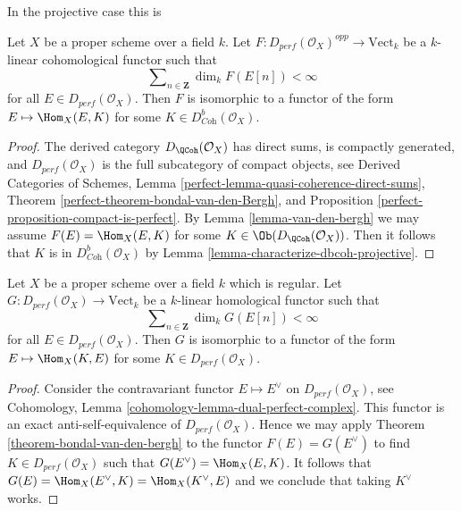 \begin{theorem}
\label{theorem-bondal-van-den-bergh}
\begin{reference}
In the projective case this is \cite[Theorem A.1]{BvdB}
\end{reference}
Let $X$ be a proper scheme over a field $k$.
Let $F : D_{perf}(\mathcal{O}_X)^{opp} \to \text{Vect}_k$
be a $k$-linear cohomological functor such that
$$
\sum\nolimits_{n \in \mathbf{Z}} \dim_k F(E[n]) < \infty
$$
for all $E \in D_{perf}(\mathcal{O}_X)$. Then $F$ is isomorphic to a functor
of the form $E \mapsto \Hom_X(E, K)$ for some
$K \in D^b_{\textit{Coh}}(\mathcal{O}_X)$.
\end{theorem}

\begin{proof}
The derived category $D_\QCoh(\mathcal{O}_X)$ has direct sums,
is compactly generated, and $D_{perf}(\mathcal{O}_X)$ is the full subcategory
of compact objects, see
Derived Categories of Schemes, Lemma
\ref{perfect-lemma-quasi-coherence-direct-sums},
Theorem \ref{perfect-theorem-bondal-van-den-Bergh}, and
Proposition \ref{perfect-proposition-compact-is-perfect}.
By Lemma \ref{lemma-van-den-bergh} we may assume
$F(E) = \Hom_X(E, K)$ for some $K \in \Ob(D_\QCoh(\mathcal{O}_X))$.
Then it follows that $K$ is in $D^b_{\textit{Coh}}(\mathcal{O}_X)$
by Lemma \ref{lemma-characterize-dbcoh-projective}.
\end{proof}

\begin{lemma}
\label{lemma-homological-representable}
Let $X$ be a proper scheme over a field $k$ which is regular.
Let $G : D_{perf}(\mathcal{O}_X) \to \text{Vect}_k$
be a $k$-linear homological functor such that
$$
\sum\nolimits_{n \in \mathbf{Z}} \dim_k G(E[n]) < \infty
$$
for all $E \in D_{perf}(\mathcal{O}_X)$. Then $G$ is isomorphic to a functor
of the form $E \mapsto \Hom_X(K, E)$ for some $K \in D_{perf}(\mathcal{O}_X)$.
\end{lemma}

\begin{proof}
Consider the contravariant functor $E \mapsto E^\vee$
on $D_{perf}(\mathcal{O}_X)$, see
Cohomology, Lemma \ref{cohomology-lemma-dual-perfect-complex}.
This functor is an exact anti-self-equivalence of $D_{perf}(\mathcal{O}_X)$.
Hence we may apply Theorem \ref{theorem-bondal-van-den-bergh}
to the functor $F(E) = G(E^\vee)$ to find
$K \in D_{perf}(\mathcal{O}_X)$ such that $G(E^\vee) = \Hom_X(E, K)$.
It follows that $G(E) = \Hom_X(E^\vee, K) = \Hom_X(K^\vee, E)$
and we conclude that taking $K^\vee$ works.
\end{proof}






